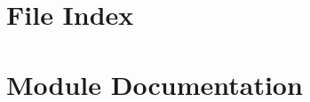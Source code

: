 \documentclass[twoside]{book}
\newcommand{\+}{\discretionary{\mbox{\scriptsize$\hookleftarrow$}}{}{}}
\begin{document}
\chapter{File Index}

\chapter{Module Documentation}



















\end{document}
